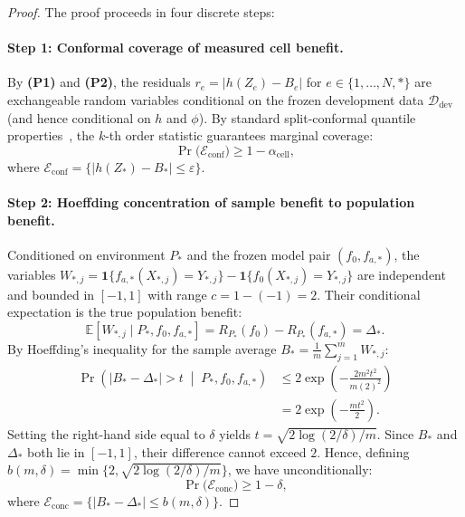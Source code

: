 \begin{proof}
The proof proceeds in four discrete steps:

\paragraph{Step 1: Conformal coverage of measured cell benefit.}
By \textbf{(P1)} and \textbf{(P2)}, the residuals $r_e = |h(Z_e) - B_e|$ for $e \in \{1, \dots, N, *\}$ are
exchangeable random variables conditional on the frozen development data $\mathcal D_{\mathrm{dev}}$
(and hence conditional on $h$ and $\phi$). By standard split-conformal quantile
properties~\cite{tibshirani2019conformal}, the $k$-th order statistic guarantees marginal coverage:
\begin{equation*}
 \Pr\bigl(\mathcal E_{\mathrm{conf}}\bigr) \ge 1 - \alpha_{\mathrm{cell}},
\end{equation*}
where $\mathcal E_{\mathrm{conf}} = \{|h(Z_*) - B_*| \le \varepsilon\}$.

\paragraph{Step 2: Hoeffding concentration of sample benefit to population benefit.}
Conditioned on environment $P_*$ and the frozen model pair $(f_0, f_{a,*})$, the variables
$W_{*,j} = \mathbf 1\{f_{a,*}(X_{*,j}) = Y_{*,j}\} - \mathbf 1\{f_0(X_{*,j}) = Y_{*,j}\}$ are independent and bounded
in $[-1, 1]$ with range $c = 1 - (-1) = 2$. Their conditional expectation is the true population benefit:
\[
 \mathbb E[W_{*,j} \mid P_*, f_0, f_{a,*}] = R_{P_*}(f_0) - R_{P_*}(f_{a,*}) = \Delta_*.
\]
By Hoeffding's inequality for the sample average $B_* = \frac{1}{m}\sum_{j=1}^m W_{*,j}$:
\begin{align*}
 \Pr\left(|B_* - \Delta_*| > t \;\middle|\; P_*, f_0, f_{a,*}\right)
 &\le 2\exp\left(-\frac{2m^2 t^2}{m(2)^2}\right) \\
 &= 2\exp\left(-\frac{m t^2}{2}\right).
\end{align*}
Setting the right-hand side equal to $\delta$ yields $t = \sqrt{2\log(2/\delta)/m}$. Since $B_*$ and $\Delta_*$ both
lie in $[-1, 1]$, their difference cannot exceed $2$. Hence, defining $b(m, \delta) = \min\{2, \sqrt{2\log(2/\delta)/m}\}$,
we have unconditionally:
\begin{equation*}
 \Pr\bigl(\mathcal E_{\mathrm{conc}}\bigr) \ge 1 - \delta,
\end{equation*}
where $\mathcal E_{\mathrm{conc}} = \{|B_* - \Delta_*| \le b(m, \delta)\}$.


\end{proof}
